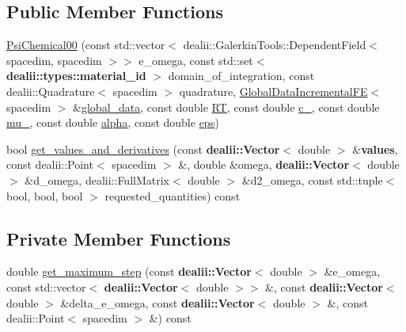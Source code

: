 \subsection*{Public Member Functions}
\begin{DoxyCompactItemize}
\item 
\hyperlink{classincremental_f_e_1_1_psi_chemical00_a2c70852c04aaa0f530c705965671f3ff}{Psi\+Chemical00} (const std\+::vector$<$ dealii\+::\+Galerkin\+Tools\+::\+Dependent\+Field$<$ spacedim, spacedim $>$$>$ e\+\_\+omega, const std\+::set$<$ {\bf dealii\+::types\+::material\+\_\+id} $>$ domain\+\_\+of\+\_\+integration, const dealii\+::\+Quadrature$<$ spacedim $>$ quadrature, \hyperlink{classincremental_f_e_1_1_global_data_incremental_f_e}{Global\+Data\+Incremental\+FE}$<$ spacedim $>$ \&\hyperlink{classincremental_f_e_1_1_psi_3_01spacedim_00_01spacedim_01_4_abf0a4804877fd7cc9bd1b90e52760ba9}{global\+\_\+data}, const double \hyperlink{classincremental_f_e_1_1_psi_chemical00_ad2500e079225b055e821ecc9e4baf3b6}{RT}, const double \hyperlink{classincremental_f_e_1_1_psi_chemical00_a2ad0343d949c11ca7ce23618939a623b}{c\+\_}, const double \hyperlink{classincremental_f_e_1_1_psi_chemical00_a3c264a3e33072def54f2376ee9a0b4ea}{mu\+\_}, const double \hyperlink{classincremental_f_e_1_1_psi_3_01spacedim_00_01spacedim_01_4_af7b8227188dbdd6ada35b9445d96c79d}{alpha}, const double \hyperlink{classincremental_f_e_1_1_psi_chemical00_a8016f9e379c596ca0ed60479110a3178}{eps})
\item 
bool \hyperlink{classincremental_f_e_1_1_psi_chemical00_a3d389bfb7281b23f250fc23fca216c99}{get\+\_\+values\+\_\+and\+\_\+derivatives} (const {\bf dealii\+::\+Vector}$<$ double $>$ \&{\bf values}, const dealii\+::\+Point$<$ spacedim $>$ \&, double \&omega, {\bf dealii\+::\+Vector}$<$ double $>$ \&d\+\_\+omega, dealii\+::\+Full\+Matrix$<$ double $>$ \&d2\+\_\+omega, const std\+::tuple$<$ bool, bool, bool $>$ requested\+\_\+quantities) const 
\end{DoxyCompactItemize}
\subsection*{Private Member Functions}
\begin{DoxyCompactItemize}
\item 
double \hyperlink{classincremental_f_e_1_1_psi_chemical00_ad1cafebc95e211956f5a1db4a58019eb}{get\+\_\+maximum\+\_\+step} (const {\bf dealii\+::\+Vector}$<$ double $>$ \&e\+\_\+omega, const std\+::vector$<$ {\bf dealii\+::\+Vector}$<$ double $>$$>$ \&, const {\bf dealii\+::\+Vector}$<$ double $>$ \&delta\+\_\+e\+\_\+omega, const {\bf dealii\+::\+Vector}$<$ double $>$ \&, const dealii\+::\+Point$<$ spacedim $>$ \&) const 
\end{DoxyCompactItemize}
